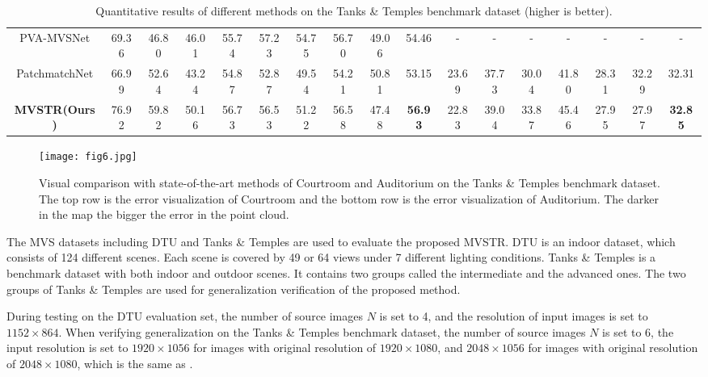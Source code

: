 \documentclass[10pt,twocolumn,letterpaper]{article}
\begin{document}
\begin{table*}[htbp]
{\begin{tabular}{c|cccccccc|c|cccccc|c}
			PVA-MVSNet \cite{pvamvsnet} & 69.36  & 46.80  & 46.01  & 55.74  & 57.23  & 54.75  & 56.70  & 49.06  & 54.46  &  -    &  -    &  -    &  -    &  -    &  -    &  - \\
			PatchmatchNet \cite{patchmatchnet} & 66.99  & 52.64  & 43.24  & 54.87  & 52.87  & 49.54  & 54.21  & 50.81  & 53.15  & 23.69  & 37.73  & 30.04  & 41.80  & 28.31  & 32.29  & 32.31  \\
			\textbf{MVSTR(Ours)} & 76.92  & 59.82  & 50.16  & 56.73  & 56.53  & 51.22  & 56.58  & 47.48  & \textbf{56.93}  & 22.83  & 39.04  & 33.87  & 45.46  & 27.95  & 27.97  & \textbf{32.85} \\
			\hline
		\end{tabular}%
	}
	\caption{Quantitative results of different methods on the Tanks \& Temples benchmark dataset (higher is better).}
	\label{tab.2}%
	\vspace{0.2cm}
\end{table*}%

\begin{figure*}[!]
	\centering
	\texttt{[image: fig6.jpg]}
	\caption{Visual comparison with state-of-the-art methods \cite{rmvsnet,casmvsnet,patchmatchnet} of Courtroom and Auditorium on the Tanks \& Temples benchmark dataset. The top row is the error visualization of Courtroom and the bottom row is the error visualization of Auditorium. The darker in the map the bigger the error in the point cloud.}
	\label{fig.6}
	\vspace{0.2cm}
\end{figure*}

The MVS datasets including DTU \cite{dtu} and Tanks \& Temples \cite{t&t} are used to evaluate the proposed MVSTR. DTU is an indoor dataset, which consists of 124 different scenes. Each scene is covered by 49 or 64 views under 7 different lighting conditions. Tanks \& Temples is a benchmark dataset with both indoor and outdoor scenes. It contains two groups called the intermediate and the advanced ones. The two groups of Tanks \& Temples are used for generalization verification of the proposed method.

During testing on the DTU evaluation set, the number of source images $N$ is set to 4, and the resolution of input images is set to $1152\times864$. When verifying generalization on the Tanks \& Temples benchmark dataset, the number of source images $N$ is set to 6, the input resolution is set to $1920\times1056$ for images with original resolution of $1920\times1080$, and $2048\times1056$ for images with original resolution of $2048\times1080$, which is the same as \cite{casmvsnet}.
\end{document}
